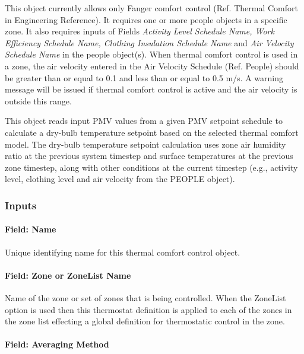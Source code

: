 This object currently allows only Fanger comfort control (Ref. Thermal Comfort in Engineering Reference). It requires one or more people objects in a specific zone. It also requires inputs of Fields \emph{Activity Level Schedule Name, Work Efficiency Schedule Name, Clothing Insulation Schedule Name} and \emph{Air Velocity Schedule Name} in the people object(s). When thermal comfort control is used in a zone, the air velocity entered in the Air Velocity Schedule (Ref. People) should be greater than or equal to 0.1 and less than or equal to 0.5 m/s. A warning message will be issued if thermal comfort control is active and the air velocity is outside this range.

This object reads input PMV values from a given PMV setpoint schedule to calculate a dry-bulb temperature setpoint based on the selected thermal comfort model. The dry-bulb temperature setpoint calculation uses zone air humidity ratio at the previous system timestep and surface temperatures at the previous zone timestep, along with other conditions at the current timestep (e.g., activity level, clothing level and air velocity from the PEOPLE object).

\subsubsection{Inputs}\label{inputs-9-025}

\paragraph{Field: Name}\label{field-name-7-024}

Unique identifying name for this thermal comfort control object.

\paragraph{Field: Zone or ZoneList Name}\label{field-zone-or-zonelist-name-2-000}

Name of the zone or set of zones that is being controlled. When the ZoneList option is used then this thermostat definition is applied to each of the zones in the zone list effecting a global definition for thermostatic control in the zone.

\paragraph{Field: Averaging Method}\label{field-averaging-method}

